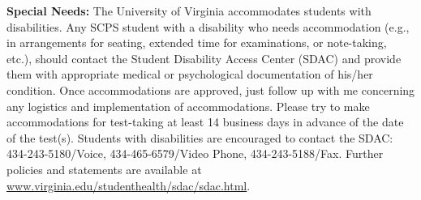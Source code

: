 \documentclass[12pt]{article}
\begin{document}
\noindent
\textbf{Special Needs:}  The University of Virginia accommodates students with disabilities. Any SCPS student with a disability who needs accommodation (e.g., in arrangements for seating, extended time for examinations, or note-taking, etc.), should contact the Student Disability Access Center (SDAC) and provide them with appropriate medical or psychological documentation of his/her condition. Once accommodations are approved, just follow up with me concerning any logistics and implementation of accommodations.  Please try to make accommodations for test-taking at least 14 business days in advance of the date of the test(s). Students with disabilities are encouraged to contact the SDAC: 434-243-5180/Voice, 434-465-6579/Video Phone, 434-243-5188/Fax. Further policies and statements are available at \url{www.virginia.edu/studenthealth/sdac/sdac.html}.

\newpage
\end{document}
